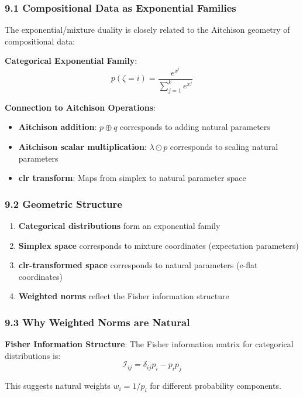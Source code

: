 \documentclass{amsart}
\theoremstyle{plain}
\theoremstyle{definition}
\theoremstyle{remark}
\begin{document}
\subsubsection{9.1 Compositional Data as Exponential Families}

The exponential/mixture duality is closely related to the Aitchison geometry of compositional data:

\textbf{Categorical Exponential Family}:
\[
p(\zeta = i) = \frac{e^{x^i}}{\sum_{j=1}^k e^{x^j}}
\]

\textbf{Connection to Aitchison Operations}:

\begin{itemize}
	\item \textbf{Aitchison addition}: $p \oplus q$ corresponds to adding natural parameters
	\item \textbf{Aitchison scalar multiplication}: $\lambda \odot p$ corresponds to scaling natural parameters
	\item \textbf{clr transform}: Maps from simplex to natural parameter space
\end{itemize}

\subsubsection{9.2 Geometric Structure}

\begin{enumerate}
	\item \textbf{Categorical distributions} form an exponential family
	\item \textbf{Simplex space} corresponds to mixture coordinates (expectation parameters)
	\item \textbf{clr-transformed space} corresponds to natural parameters (e-flat coordinates)
	\item \textbf{Weighted norms} reflect the Fisher information structure
\end{enumerate}

\subsubsection{9.3 Why Weighted Norms are Natural}

\textbf{Fisher Information Structure}:
The Fisher information matrix for categorical distributions is:
\[
\mathcal{I}_{ij} = \delta_{ij} p_i - p_i p_j
\]

This suggests natural weights $w_i = 1/p_i$ for different probability components.
\end{document}

